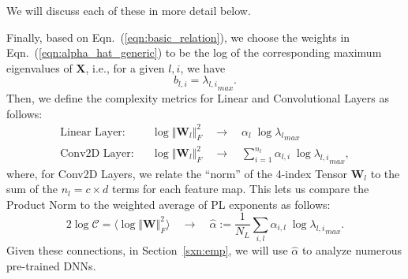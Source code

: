 We will discuss each of these in more detail below.

Finally, based on Eqn.~(\ref{eqn:basic_relation}), we choose the weights in Eqn.~(\ref{eqn:alpha_hat_generic}) to be the log of the corresponding maximum eigenvalues of $\mathbf{X}$, i.e., for a given $l,i$, we have 
$$
b_{l,i} = {\lambda_{l,i}}_{max}  .
$$
Then, we define the complexity metrics for Linear and Convolutional Layers as follows:
\begin{eqnarray*}
\text{Linear Layer:} & & \log\Vert\mathbf{W}_{l}\Vert^{2}_{F} \quad \rightarrow \quad \alpha_{l}\;\log{\lambda_{l}}_{max}  \\
\text{Conv2D Layer:} & & \log\Vert\mathbf{W}_{l}\Vert^{2}_{F} \quad \rightarrow \quad \sum_{i=1}^{n_{l}}\alpha_{l,i} \;\log{\lambda_{l,i}}_{max} , 
\end{eqnarray*}
where, for Conv2D Layers, we relate the ``norm'' of the 4-index Tensor $\mathbf{W}_{l}$ to the sum of the $n_{l}=c\times d$ terms for each feature map.
This lets us compare the Product Norm to the weighted average of PL exponents as follows:
\begin{equation}
2\log\mathcal{C}=\langle\log\Vert\mathbf{W}\Vert^{2}_{F}\rangle \quad \rightarrow \quad \hat{\alpha} := \dfrac{1}{N_{L}}\sum_{i,l}\alpha_{i,l}\;\log {\lambda_{l,i}}_{max}  .
\label{eqn:alpha_hat_specific}
\end{equation}
Given these connections, in Section~\ref{sxn:emp}, we will use $\hat{\alpha}$ to analyze numerous pre-trained DNNs.



